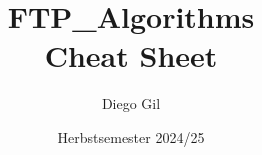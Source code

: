 \documentclass[11pt,a4paper,twocolumn]{article}
\title{\textbf{FTP\_Algorithms}\\
       \large Cheat Sheet}
\author{Diego Gil}
\date{Herbstsemester 2024/25}
\begin{document}
\onecolumn
\maketitle
\begin{multicols}{2}
\tableofcontents
\end{multicols}
\clearpage

\twocolumn

\clearpage


\clearpage





\end{document}
